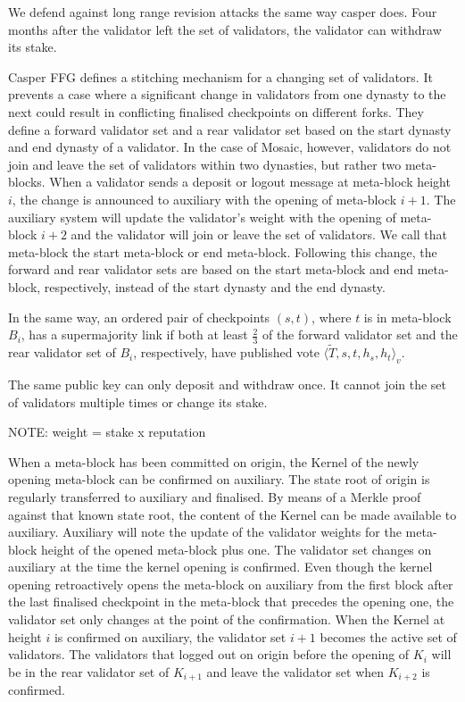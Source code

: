 \documentclass[12pt,a4paper]{article}
\begin{document}
We defend against long range revision attacks the same way casper does.
Four months after the validator left the set of validators, the validator can withdraw its stake.

Casper FFG\cite{casperffg} defines a stitching mechanism for a changing set of validators.
It prevents a case where a significant change in validators from one dynasty to the next could result in conflicting finalised checkpoints on different forks.
They define a forward validator set and a rear validator set based on the start dynasty and end dynasty of a validator.
In the case of Mosaic, however, validators do not join and leave the set of validators within two dynasties, but rather two meta-blocks.
When a validator sends a deposit or logout message at meta-block height $i$, the change is announced to auxiliary with the opening of meta-block $i+1$.
The auxiliary system will update the validator's weight with the opening of meta-block $i+2$ and the validator will join or leave the set of validators. We call that meta-block the start meta-block or end meta-block.
Following this change, the forward and rear validator sets are based on the start meta-block and end meta-block, respectively, instead of the start dynasty and the end dynasty.

 In the same way, an ordered pair of checkpoints $(s, t)$, where $t$ is in meta-block $B_i$, has a supermajority link if both at least $\frac{2}{3}$ of the forward validator set and the rear validator set of $B_i$, respectively, have published vote $\langle \tilde{T}, s, t, h_{s}, h_{t}\rangle_v$.

The same public key can only deposit and withdraw once.
It cannot join the set of validators multiple times or change its stake.

NOTE: weight = stake x reputation

When a meta-block has been committed on origin, the Kernel of the newly opening meta-block can be confirmed on auxiliary.
The state root of origin is regularly transferred to auxiliary and finalised.
By means of a Merkle proof against that known state root, the content of the Kernel can be made available to auxiliary.
Auxiliary will note the update of the validator weights for the meta-block height of the opened meta-block plus one.
The validator set changes on auxiliary at the time the kernel opening is confirmed.
Even though the kernel opening retroactively opens the meta-block on auxiliary from the first block after the last finalised checkpoint in the meta-block that precedes the opening one, the validator set only changes at the point of the confirmation.
When the Kernel at height $i$ is confirmed on auxiliary, the validator set $i+1$ becomes the active set of validators.
The validators that logged out on origin before the opening of $K_i$ will be in the rear validator set of $K_{i+1}$ and leave the validator set when $K_{i+2}$ is confirmed.
\end{document}
